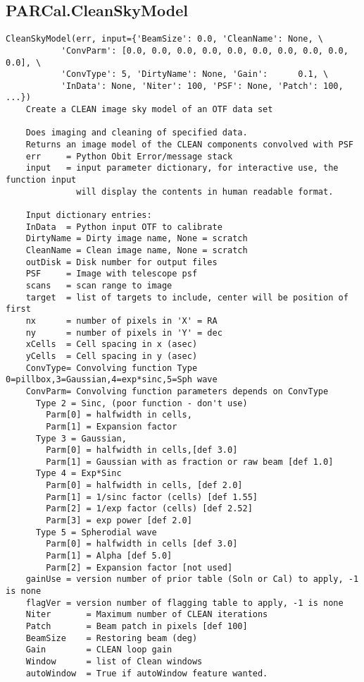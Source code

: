 \documentclass[11pt]{report}
\begin{document}
\subsection{PARCal.CleanSkyModel}
\begin{verbatim}
CleanSkyModel(err, input={'BeamSize': 0.0, 'CleanName': None, \
           'ConvParm': [0.0, 0.0, 0.0, 0.0, 0.0, 0.0, 0.0, 0.0, 0.0, 0.0], \
           'ConvType': 5, 'DirtyName': None, 'Gain':	  0.1, \
           'InData': None, 'Niter': 100, 'PSF': None, 'Patch': 100, ...})
    Create a CLEAN image sky model of an OTF data set
    
    Does imaging and cleaning of specified data.
    Returns an image model of the CLEAN components convolved with PSF
    err     = Python Obit Error/message stack
    input   = input parameter dictionary, for interactive use, the function input
              will display the contents in human readable format.
    
    Input dictionary entries:
    InData  = Python input OTF to calibrate
    DirtyName = Dirty image name, None = scratch
    CleanName = Clean image name, None = scratch
    outDisk = Disk number for output files
    PSF     = Image with telescope psf
    scans   = scan range to image
    target  = list of targets to include, center will be position of first
    nx      = number of pixels in 'X' = RA
    ny      = number of pixels in 'Y' = dec
    xCells  = Cell spacing in x (asec)
    yCells  = Cell spacing in y (asec)
    ConvType= Convolving function Type 0=pillbox,3=Gaussian,4=exp*sinc,5=Sph wave
    ConvParm= Convolving function parameters depends on ConvType
      Type 2 = Sinc, (poor function - don't use)
        Parm[0] = halfwidth in cells,
        Parm[1] = Expansion factor
      Type 3 = Gaussian,
        Parm[0] = halfwidth in cells,[def 3.0]
        Parm[1] = Gaussian with as fraction or raw beam [def 1.0]
      Type 4 = Exp*Sinc
        Parm[0] = halfwidth in cells, [def 2.0]
        Parm[1] = 1/sinc factor (cells) [def 1.55]
        Parm[2] = 1/exp factor (cells) [def 2.52]
        Parm[3] = exp power [def 2.0]
      Type 5 = Spherodial wave 
        Parm[0] = halfwidth in cells [def 3.0]
        Parm[1] = Alpha [def 5.0]
        Parm[2] = Expansion factor [not used]
    gainUse = version number of prior table (Soln or Cal) to apply, -1 is none
    flagVer = version number of flagging table to apply, -1 is none
    Niter       = Maximum number of CLEAN iterations
    Patch       = Beam patch in pixels [def 100]
    BeamSize    = Restoring beam (deg)
    Gain        = CLEAN loop gain
    Window      = list of Clean windows
    autoWindow  = True if autoWindow feature wanted.
\end{verbatim}
\end{document}
